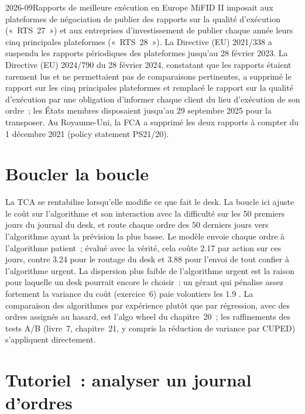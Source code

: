 \begin{dated}{2026-09}{Rapports de meilleure exécution en Europe}\label{dat:mx:transaction-cost-analysis:rts}
MiFID II imposait aux plateformes de négociation de publier des rapports sur la qualité d'exécution («~RTS~27~») et aux entreprises d'investissement de publier chaque année leurs cinq principales plateformes
(«~RTS~28~»). La Directive (EU) 2021/338 a suspendu les rapports périodiques des plateformes jusqu'au 28 février 2023. La Directive (EU) 2024/790 du 28 février 2024, constatant
que les rapports étaient rarement lus et ne permettaient pas de comparaisons pertinentes, a supprimé le rapport sur les cinq principales plateformes et remplacé le rapport sur la qualité d'exécution
par une obligation d'informer chaque client du lieu d'exécution de son ordre~; les États membres disposaient jusqu'au 29 septembre 2025 pour la transposer. Au Royaume-Uni, la
FCA a supprimé les deux rapports à compter du 1 décembre 2021 (policy statement PS21/20).
\end{dated}

\section{Boucler la boucle}

La TCA se rentabilise lorsqu'elle modifie ce que fait le desk. La boucle ici ajuste le coût sur l'algorithme et son interaction avec la difficulté sur les
50 premiers jours du journal du desk, et route chaque ordre des 50 derniers jours vers l'algorithme ayant la prévision la plus basse. Le modèle envoie chaque ordre à
l'algorithme patient~; évalué avec la vérité, cela coûte 2.17  par action sur ces jours, contre 3.24 pour le routage du desk et 3.88 pour l'envoi
de tout confier à l'algorithme urgent. La dispersion plus faible de l'algorithme urgent est la raison pour laquelle un desk pourrait encore le choisir~: un gérant qui pénalise
assez fortement la variance du coût (exercice~6) paie volontiers les 1.9 . La comparaison des algorithmes par expérience plutôt que par régression, avec des ordres
assignés au hasard, est l'algo wheel du chapitre~20~; les raffinements des tests A/B (livre~7, chapitre~21, y compris la réduction de variance par CUPED)
s'appliquent directement.

\section{Tutoriel~: analyser un journal d'ordres}\label{tut:mx:transaction-cost-analysis:tut}

